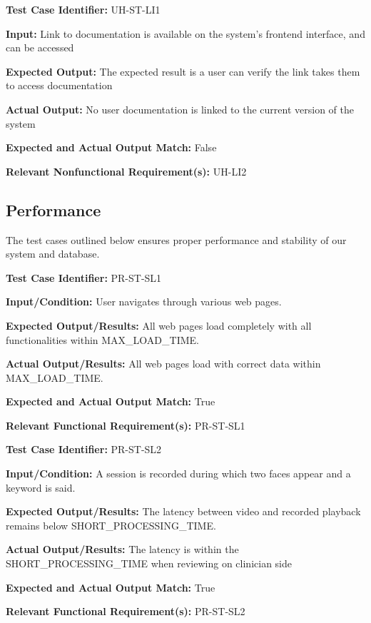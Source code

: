 \documentclass[12pt, titlepage]{article}
\begin{document}
\begin{mdframed}[linewidth=0.5mm] \par
  \textbf{Test Case Identifier:} UH-ST-LI1 \par
  \textbf{Input:} Link to documentation is available on the system's frontend interface, and can be accessed \par
  \textbf{Expected Output:} The expected result is a user can verify the link takes them to access documentation  \par
  \textbf{Actual Output:} No user documentation is linked to the current version of the system\par
  \textbf{Expected and Actual Output Match:} False \par
  \textbf{Relevant Nonfunctional Requirement(s):} UH-LI2
\end{mdframed}

\subsection{Performance}
\hspace{2em}The test cases outlined below ensures proper performance and stability of our system and database.
\begin{mdframed}[linewidth=0.5mm]
  \textbf{Test Case Identifier:} PR-ST-SL1 \par
  \textbf{Input/Condition:} User navigates through various web pages. \par
  \textbf{Expected Output/Results:} All web pages load completely with all functionalities within MAX\_LOAD\_TIME. \par
  \textbf{Actual Output/Results:} All web pages load with correct data within MAX\_LOAD\_TIME. \par
  \textbf{Expected and Actual Output Match:} True \par
  \textbf{Relevant Functional Requirement(s):} PR-ST-SL1
\end{mdframed}

\begin{mdframed}[linewidth=0.5mm]
  \textbf{Test Case Identifier:} PR-ST-SL2 \par
  \textbf{Input/Condition:} A session is recorded during which two faces appear and a keyword is said. \par
  \textbf{Expected Output/Results:} The latency between video and recorded playback remains below SHORT\_PROCESSING\_TIME. \par
  \textbf{Actual Output/Results:} The latency is within the \\SHORT\_PROCESSING\_TIME when reviewing on clinician side \par
  \textbf{Expected and Actual Output Match:} True \par
  \textbf{Relevant Functional Requirement(s):} PR-ST-SL2
\end{mdframed}
\end{document}
